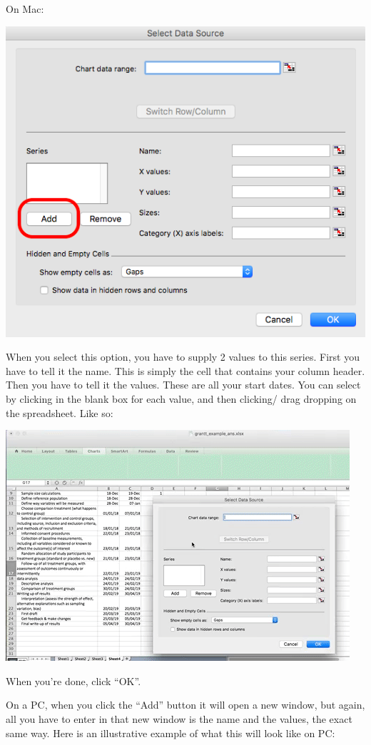 \documentclass[
]{book}
\begin{document}
On Mac:

\includegraphics{imgs/mac_add_data.png}

When you select this option, you have to supply 2 values to this series. First you have to tell it the name. This is simply the cell that contains your column header. Then you have to tell it the values. These are all your start dates. You can select by clicking in the blank box for each value, and then clicking/ drag dropping on the spreadsheet. Like so:

\includegraphics{imgs/gantt_select_data_1.gif}

When you're done, click ``OK''.

On a PC, when you click the ``Add'' button it will open a new window, but again, all you have to enter in that new window is the name and the values, the exact same way. Here is an illustrative example of what this will look like on PC:
\end{document}
